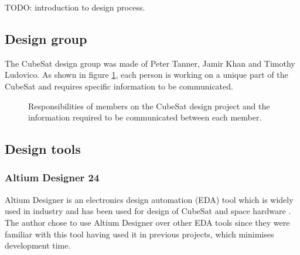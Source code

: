 \documentclass[a4paper,11pt]{article}
\begin{document}
TODO: introduction to design process.

\subsection{Design group}

The CubeSat design group was made of Peter Tanner, Jamir Khan and Timothy Ludovico. As shown in figure \ref{fig:cubesat-responsibilities}, each person is working on a unique part of the CubeSat and requires specific information to be communicated.

\begin{figure}[H]
  \centering
  
  \caption{Responsibilities of members on the CubeSat design project and the information required to be communicated between each member.}
  \label{fig:cubesat-responsibilities}
\end{figure}




\subsection{Design tools}

\subsubsection{Altium Designer 24}

Altium Designer is an electronics design automation (EDA) tool which is widely used in industry and has been used for design of CubeSat and space hardware \cite{10061409}. %
The author chose to use Altium Designer over other EDA tools since they were familiar with this tool having used it in previous projects, which minimises development time.
\end{document}

